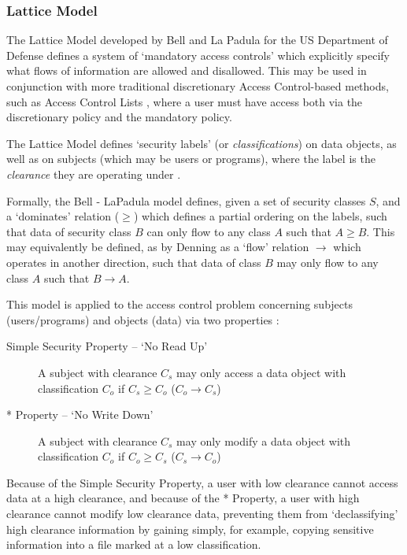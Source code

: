 \subsubsection{Lattice Model}

The Lattice Model developed by Bell and La Padula for the US Department of Defense \cite{bell1976lattice} defines a system of `mandatory access controls' which explicitly specify what flows of information are allowed and disallowed. This may be used in conjunction with more traditional discretionary Access Control-based methods, such as Access Control Lists \cite{sandhu1993lattice}, where a user must have access both via the discretionary policy and the mandatory policy.

The Lattice Model defines `security labels' (or \textit{classifications}) on data objects, as well as on subjects (which may be users or programs), where the label is the \textit{clearance} they are operating under \cite{denning1976lattice}.

Formally, the Bell - LaPadula model defines, given a set of security classes $ S $, and a `dominates' relation ($ \ge $) \cite{sandhu1993lattice} which defines a partial ordering on the labels, such that data of security class $ B $ can only flow to any class $ A $ such that $ A \ge B $. This may equivalently be defined, as by Denning \cite{denning1976lattice} as a `flow' relation $ \rightarrow $ which operates in another direction, such that data of class $ B $ may only flow to any class $ A $ such that $ B \rightarrow A $.

This model is applied to the access control problem concerning subjects (users/programs) and objects (data) via two properties \cite{bell1973lattice}:

\begin{description}
	\item[Simple Security Property -- `No Read Up'] A subject with clearance $ C_s $ may only access a data object with classification $ C_o $ if $ C_s \ge C_o $ ($ C_o \rightarrow C_s $)
	\item[* Property -- `No Write Down'] A subject with clearance $ C_s $ may only modify a data object with classification $ C_o $ if $ C_o \ge C_s $ ($ C_s \rightarrow C_o $)
\end{description}

Because of the Simple Security Property, a user with low clearance cannot access data at a high clearance, and because of the * Property, a user with high clearance cannot modify low clearance data, preventing them from `declassifying' high clearance information by gaining simply, for example, copying sensitive information into a file marked at a low classification.

